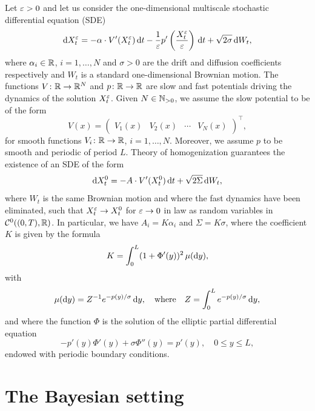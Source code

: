 \documentclass[10pt]{article}
\begin{document}
Let $\varepsilon > 0$ and let us consider the one-dimensional multiscale stochastic differential equation (SDE)
\begin{equation}\label{eq:SDE_MS}
	\mathrm{d} X_t^\varepsilon = -\alpha \cdot V'(X_t^\varepsilon) \,\mathrm{d} t - \frac1{\varepsilon} p'\left(\frac{X_t^\varepsilon}{\varepsilon}\right) \,\mathrm{d} t + \sqrt{2\sigma} \,\mathrm{d} W_t,
\end{equation}
where $\alpha_i \in \mathbb{R}$, $i = 1, \ldots, N$ and $\sigma > 0$ are the drift and diffusion coefficients respectively and $W_t$ is a standard one-dimensional Brownian motion. The functions $V\colon \mathbb{R} \to \mathbb{R}^N$ and $p\colon \mathbb{R} \to \mathbb{R}$ are slow and fast potentials driving the dynamics of the solution $X_t^\varepsilon$. Given $N \in \mathbb{N}_{>0}$, we assume the slow potential to be of the form
\begin{equation}\label{eq:Potential}
	V(x) = \begin{pmatrix} V_1(x) & V_2(x) & \cdots & V_N(x) \end{pmatrix}^\top,
\end{equation}
for smooth functions $V_i\colon \mathbb{R} \to \mathbb{R}$, $i = 1, \ldots, N$. Moreover, we assume $p$ to be smooth and periodic of period $L$. Theory of homogenization \cite{BLP78} guarantees the existence of an SDE of the form
\begin{equation}\label{eq:SDE_HOM}
	\mathrm{d} X_t^0 = - A \cdot V'(X_t^0) \,\mathrm{d} t + \sqrt{2\Sigma} \,\mathrm{d} W_t,
\end{equation}
where $W_t$ is the same Brownian motion and where the fast dynamics have been eliminated, such that $X_t^\varepsilon \to X_t^0$ for $\varepsilon\to 0$ in law as random variables in $\mathcal C^0((0, T), \mathbb{R})$. In particular, we have $A_i = K\alpha_i$ and $\Sigma = K \sigma$, where the coefficient $K$ is given by the formula
\begin{equation}\label{eq:K_HOM}
	K = \int_0^L (1 + \Phi'(y))^2 \, \mu(\mathrm{d} y),
\end{equation}
with 
\begin{equation}
	\mu(\mathrm{d} y) = Z^{-1} e^{-p(y)/\sigma} \,\mathrm{d} y, \quad\text{where}\quad Z = \int_0^L e^{-p(y)/\sigma} \,\mathrm{d} y,
\end{equation}
and where the function $\Phi$ is the solution of the elliptic partial differential equation
\begin{equation}
	-p'(y)\Phi'(y) + \sigma \Phi''(y) = p'(y), \quad 0 \leq y \leq L,
\end{equation}
endowed with periodic boundary conditions.

\section{The Bayesian setting}\label{sec:Bayesian}
\end{document}
